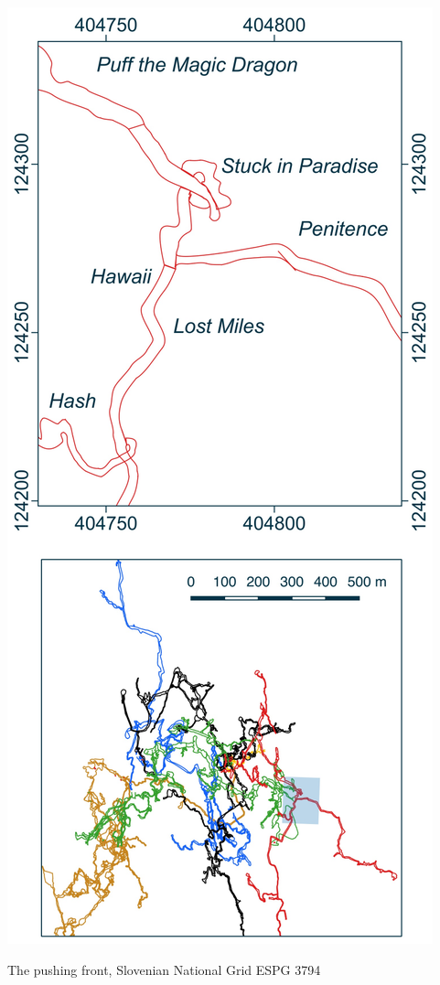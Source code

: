 \begin{marginsurvey}
\checkoddpage \ifoddpage \forcerectofloat \else \forceversofloat \fi
\centering
 \includegraphics[width=\linewidth]{images/little_insets/hawaii_inset.pdf}
 \caption[Survey of Hash]{The \protect{} pushing front, Slovenian National Grid ESPG 3794}
 \label{Red Cow inset}
\end{marginsurvey}


